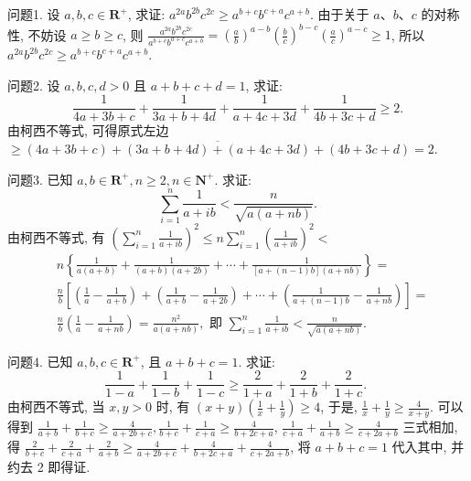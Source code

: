 
问题1. 设 $a, b, c \in \mathbf{R}^{+}$, 求证: $a^{2 a} b^{2 b} c^{2 c} \geqslant a^{b+c} b^{c+a} c^{a+b}$.
由于关于 $a 、 b 、 c$ 的对称性, 不妨设 $a \geqslant b \geqslant c$, 则 $\frac{a^{2 a} b^{2 b} c^{2 c}}{a^{b+c} b^{a+c} c^{a+b}}= \left(\frac{a}{b}\right)^{a-b}\left(\frac{b}{c}\right)^{b-c}\left(\frac{a}{c}\right)^{a-c} \geqslant 1$, 所以 $a^{2 a} b^{2 b} c^{2 c} \geqslant a^{b+c} b^{c+a} c^{a+b}$.



问题2. 设 $a, b, c, d>0$ 且 $a+b+c+d=1$, 求证:
$$
\frac{1}{4 a+3 b+c}+\frac{1}{3 a+b+4 d}+\frac{1}{a+4 c+3 d}+\frac{1}{4 b+3 c+d} \geqslant 2 .
$$
由柯西不等式, 可得原式左边 $\geqslant \overline{(4 a+3 b+c)+(3 a+b+4 d)+(a+4 c+3 d)+(4 b+3 c+d)}=2$.



问题3. 已知 $a, b \in \mathbf{R}^{+}, n \geqslant 2, n \in \mathbf{N}^{+}$. 求证:
$$
\sum_{i=1}^n \frac{1}{a+i b}<\frac{n}{\sqrt{a(a+n b)}} .
$$
由柯西不等式, 有 $\left(\sum_{i=1}^n \frac{1}{a+i b}\right)^2 \leqslant n \sum_{i=1}^n\left(\frac{1}{a+i b}\right)^2<$
$$
\begin{aligned}
& n\left\{\frac{1}{a(a+b)}+\frac{1}{(a+b)(a+2 b)}+\cdots+\frac{1}{[a+(n-1) b](a+n b)}\right\}= \\
& \frac{n}{b}\left[\left(\frac{1}{a}-\frac{1}{a+b}\right)+\left(\frac{1}{a+b}-\frac{1}{a+2 b}\right)+\cdots+\left(\frac{1}{a+(n-1) b}-\frac{1}{a+n b}\right)\right]= \\
& \frac{n}{b}\left(\frac{1}{a}-\frac{1}{a+n b}\right)=\frac{n^2}{a(a+n b)}, \text { 即 } \sum_{i=1}^n \frac{1}{a+i b}<\frac{n}{\sqrt{a(a+n b)}} .
\end{aligned}
$$



问题4. 已知 $a, b, c \in \mathbf{R}^{+}$, 且 $a+b+c=1$. 求证:
$$
\frac{1}{1-a}+\frac{1}{1-b}+\frac{1}{1-c} \geqslant \frac{2}{1+a}+\frac{2}{1+b}+\frac{2}{1+c} \text {. }
$$
由柯西不等式, 当 $x, y>0$ 时, 有 $(x+y)\left(\frac{1}{x}+\frac{1}{y}\right) \geqslant 4$, 于是, $\frac{1}{x}+ \frac{1}{y} \geqslant \frac{4}{x+y}$. 可以得到 $\frac{1}{a+b}+\frac{1}{b+c} \geqslant \frac{4}{a+2 b+c}, \frac{1}{b+c}+\frac{1}{c+a} \geqslant \frac{4}{b+2 c+a}$, $\frac{1}{c+a}+\frac{1}{a+b} \geqslant \frac{4}{c+2 a+b}$ 三式相加, 得 $\frac{2}{b+c}+\frac{2}{c+a}+\frac{2}{a+b} \geqslant \frac{4}{a+2 b+c}+ \frac{4}{b+2 c+a}+\frac{4}{c+2 a+b}$, 将 $a+b+c=1$ 代入其中, 并约去 2 即得证.



